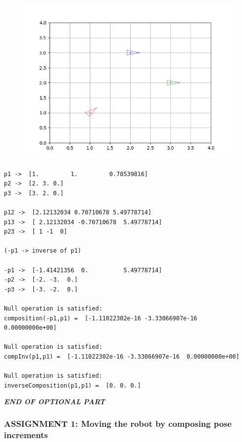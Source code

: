 \documentclass[11pt]{article}
\begin{document}
    
\begin{figure}
\centering
\includegraphics{returns/31opt.png}
\end{figure}

    
    \begin{Verbatim}[commandchars=\\\{\}]
p1 ->  [1.         1.         0.78539816]
p2 ->  [2. 3. 0.]
p3 ->  [3. 2. 0.]

p12 ->  [2.12132034 0.70710678 5.49778714]
p13 ->  [ 2.12132034 -0.70710678  5.49778714]
p23 ->  [ 1 -1  0]

(-p1 -> inverse of p1)

-p1 ->  [-1.41421356  0.          5.49778714]
-p2 ->  [-2. -3.  0.]
-p3 ->  [-3. -2.  0.]

Null operation is satisfied:
composition(-p1,p1) =  [-1.11022302e-16 -3.33066907e-16  0.00000000e+00]

Null operation is satisfied:
compInv(p1,p1) =  [-1.11022302e-16 -3.33066907e-16  0.00000000e+00]

Null operation is satisfied:
inverseComposition(p1,p1) =  [0. 0. 0.]
    \end{Verbatim}

    {\textbf{\emph{END OF OPTIONAL PART}}}

    \hypertarget{assignment-1-moving-the-robot-by-composing-pose-increments}{%
\subsubsection{\texorpdfstring{\textbf{{ASSIGNMENT 1: Moving the robot
by composing pose
increments}}}{ASSIGNMENT 1: Moving the robot by composing pose increments}}\label{assignment-1-moving-the-robot-by-composing-pose-increments}}
\end{document}
